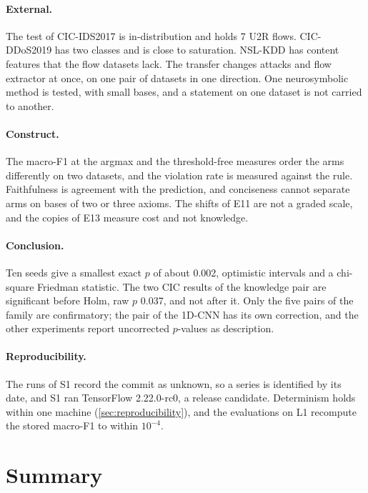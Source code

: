 \paragraph{External.}
The test of CIC-IDS2017 is in-distribution and holds 7 U2R flows. CIC-DDoS2019 has two classes and is close to
saturation. NSL-KDD has content features that the flow datasets lack. The transfer changes attacks and flow extractor at
once, on one pair of datasets in one direction. One neurosymbolic method is tested, with small bases, and a statement on
one dataset is not carried to another.

\paragraph{Construct.}
The macro-F1 at the argmax and the threshold-free measures order the arms differently on two datasets, and the violation
rate is measured against the rule. Faithfulness is agreement with the prediction,
and conciseness cannot separate arms on bases of two or three axioms. The shifts of E11 are not a graded scale, and the
copies of E13 measure cost and not knowledge.

\paragraph{Conclusion.}
Ten seeds give a smallest exact $p$ of about 0.002, optimistic intervals and a chi-square Friedman statistic. The two CIC
results of the knowledge pair are significant before Holm, raw $p$ 0.037, and not after it. Only the five pairs of the
family are confirmatory; the pair of the 1D-CNN has its own correction, and the other experiments report uncorrected
$p$-values as description.

\paragraph{Reproducibility.}
The runs of S1 record the commit as unknown, so a series is identified by its date, and S1 ran TensorFlow
2.22.0-rc0, a release candidate. Determinism holds within one machine (\cref{sec:reproducibility}), and the evaluations on
L1 recompute the stored macro-F1 to within $10^{-4}$.

\section{Summary}
\label{sec:res-summary}


